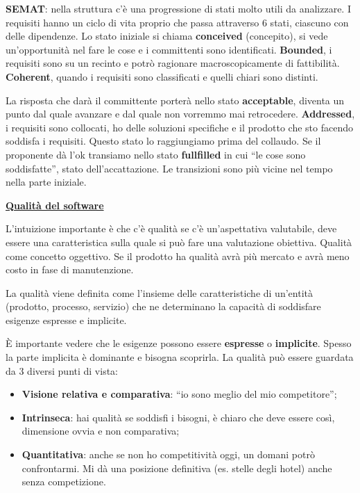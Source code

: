 \textbf{SEMAT}: nella struttura c'è una progressione di stati molto utili da analizzare. I requisiti hanno un ciclo di vita proprio che passa attraverso 6 stati, ciascuno con delle dipendenze. Lo stato iniziale si chiama \textbf{conceived} (concepito), si vede un'opportunità nel fare le cose e i committenti sono identificati. \textbf{Bounded}, i requisiti sono su un recinto e potrò ragionare macroscopicamente di fattibilità. \textbf{Coherent}, quando i requisiti sono classificati e quelli chiari sono distinti.

La risposta che darà il committente porterà nello stato \textbf{acceptable}, diventa un punto dal quale avanzare e dal quale non vorremmo mai retrocedere. \textbf{Addressed}, i requisiti sono collocati, ho delle soluzioni specifiche e il prodotto che sto facendo soddisfa i requisiti. Questo stato lo raggiungiamo prima del collaudo. Se il proponente dà l'ok transiamo nello stato \textbf{fullfilled} in cui ``le cose sono soddisfatte'', stato dell'accattazione. Le transizioni sono più vicine nel tempo nella parte iniziale.

\underline{\textbf{Qualità del software}}

L'intuizione importante è che c'è qualità se c'è un'aspettativa valutabile, deve essere una caratteristica sulla quale si può fare una valutazione obiettiva. Qualità come concetto oggettivo. Se il prodotto ha qualità avrà più mercato e avrà meno costo in fase di manutenzione.


La qualità viene definita come l'insieme delle caratteristiche di un'entità (prodotto, processo, servizio) che ne determinano la capacità di soddisfare esigenze espresse e implicite.

È importante vedere che le esigenze possono essere \textbf{espresse} o \textbf{implicite}. Spesso la parte implicita è dominante e bisogna scoprirla. La qualità può essere guardata da 3 diversi punti di vista:

\begin{itemize}

	\item \textbf{Visione relativa e comparativa}: ``io sono meglio del mio competitore'';
	\item \textbf{Intrinseca}: hai qualità se soddisfi i bisogni, è chiaro che deve essere così, dimensione ovvia e non comparativa;
	\item \textbf{Quantitativa}: anche se non ho competitività oggi, un domani potrò confrontarmi. Mi dà una posizione definitiva (es. stelle degli hotel) anche senza competizione.

\end{itemize} 

